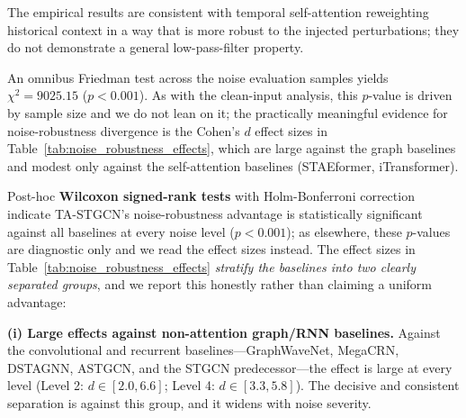 \documentclass[journal,twocolumn]{IEEEtran}
\begin{document}
The empirical results are consistent with temporal self-attention reweighting historical context in a way that is more robust to the injected perturbations; they do not demonstrate a general low-pass-filter property.

An omnibus Friedman test across the noise evaluation samples yields $\chi^2 = 9025.15$ ($p < 0.001$). As with the clean-input analysis, this $p$-value is driven by sample size and we do not lean on it; the practically meaningful evidence for noise-robustness divergence is the Cohen's $d$ effect sizes in Table~\ref{tab:noise_robustness_effects}, which are large against the graph baselines and modest only against the self-attention baselines (STAEformer, iTransformer).

\begin{table}[htbp]
\centering
\caption{Cohen's $d$ Effect Sizes (vs. TA-STGCN) Under Simulated Perception Noise. Positive values indicate TA-STGCN superiority.}
\label{tab:noise_robustness_effects}
\end{table}

Post-hoc \textbf{Wilcoxon signed-rank tests} with Holm-Bonferroni correction indicate TA-STGCN's noise-robustness advantage is statistically significant against all baselines at every noise level ($p < 0.001$); as elsewhere, these $p$-values are diagnostic only and we read the effect sizes instead. The effect sizes in Table~\ref{tab:noise_robustness_effects} \emph{stratify the baselines into two clearly separated groups}, and we report this honestly rather than claiming a uniform advantage:

\textbf{(i) Large effects against non-attention graph/RNN baselines.} Against the convolutional and recurrent baselines---GraphWaveNet, MegaCRN, DSTAGNN, ASTGCN, and the STGCN predecessor---the effect is large at every level (Level 2: $d \in [2.0, 6.6]$; Level 4: $d \in [3.3, 5.8]$). The decisive and consistent separation is against this group, and it widens with noise severity.
\end{document}
